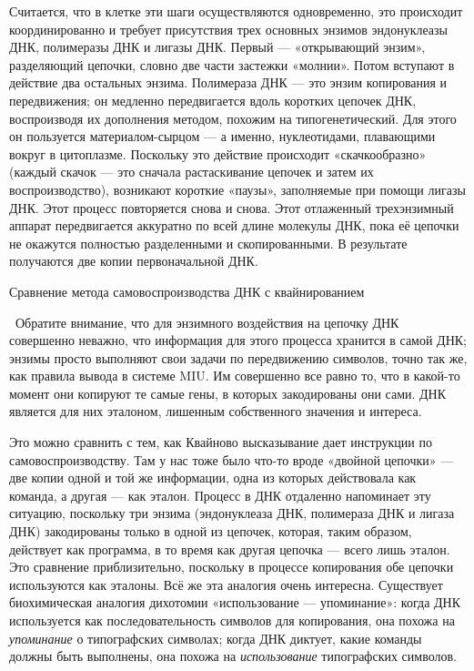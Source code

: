 \documentclass[../main.tex]{subfiles}
\begin{document}
Считается, что в клетке эти шаги осуществляются одновременно, это происходит координированно и требует присутствия трех основных энзимов эндонуклеазы ДНК, полимеразы ДНК и лигазы ДНК. Первый --- «открывающий энзим», разделяющий цепочки, словно две части застежки «молнии». Потом вступают в действие два остальных энзима. Полимераза ДНК --- это энзим копирования и передвижения; он медленно передвигается вдоль коротких цепочек ДНК, воспроизводя их дополнения методом, похожим на типогенетический. Для этого он пользуется материалом-сырцом --- а именно, нуклеотидами, плавающими вокруг в цитоплазме. Поскольку это действие происходит «скачкообразно» (каждый скачок --- это сначала растаскивание цепочек и затем их воспроизводство), возникают короткие «паузы», заполняемые при помощи лигазы ДНК. Этот процесс повторяется снова и снова. Этот отлаженный трехэнзимный аппарат передвигается аккуратно по всей длине молекулы ДНК, пока её цепочки не окажутся полностью разделенными и скопированными. В результате получаются две копии первоначальной ДНК.

Сравнение метода самовоспроизводства ДНК с квайнированием

~Обратите внимание, что для энзимного воздействия на цепочку ДНК совершенно неважно, что информация для этого процесса хранится в самой ДНК; энзимы просто выполняют свои задачи по передвижению символов, точно так же, как правила вывода в системе MIU. Им совершенно все равно то, что в какой-то момент они копируют те самые гены, в которых закодированы они сами. ДНК является для них эталоном, лишенным собственного значения и интереса.

Это можно сравнить с тем, как Квайново высказывание дает инструкции по самовоспроизводству. Там у нас тоже было что-то вроде «двойной цепочки» --- две копии одной и той же информации, одна из которых действовала как команда, а другая --- как эталон. Процесс в ДНК отдаленно напоминает эту ситуацию, поскольку три энзима (эндонуклеаза ДНК, полимераза ДНК и лигаза ДНК) закодированы только в одной из цепочек, которая, таким образом, действует как программа, в то время как другая цепочка --- всего лишь эталон. Это сравнение приблизительно, поскольку в процессе копирования обе цепочки используются как эталоны. Всё же эта аналогия очень интересна. Существует биохимическая аналогия дихотомии «использование --- упоминание»: когда ДНК используется как последовательность символов для копирования, она похожа на \emph{упоминание} о типографских символах; когда ДНК диктует, какие команды должны быть выполнены, она похожа на \emph{использование} типографских символов.
\end{document}
